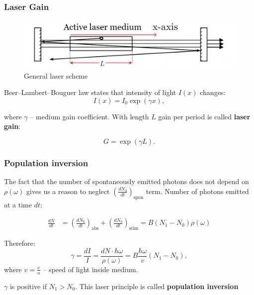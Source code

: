 \documentclass{beamer}
\begin{document}
	\begin{frame}
	\frametitle{Laser Gain}
	
	\begin{figure}
		\centering
		\includegraphics[width=1\linewidth]{res/general_laser_scheme.pdf}
		\caption{General laser scheme}
		\label{fig:general_laser_scheme}
	\end{figure}
	Beer–Lambert–Bouguer law states that intensity of light $I(x)$ changes:
	$$I(x) = I_0 \exp({\gamma x}),$$
	
	where $\gamma$ -- medium gain coefficient. With length $L$ gain per period is called \textbf{laser gain}:
	
	$$G = \exp{(\gamma L)}.$$
	\end{frame}
	
	\begin{frame}
		\frametitle{Population inversion}
		The fact that the number of spontaneously emitted photons does not depend on  $\rho(\omega)$ gives us a reason to neglect $\left(\frac{dN_0}{dt}\right)_{\text{spon}}$ term. Number of photons emitted at a time $dt$:
		
		\begin{equation} \label{eq1}
			\begin{split}
				\frac{dN}{dt} & = \left(\frac{dN_0}{dt}\right)_{\text{abs}} + \left(\frac{dN_0}{dt}\right)_{\text{stim}} =  B (N_1 - N_0) \rho(\omega)
			\end{split}
		\end{equation}

		Therefore:
		\begin{equation}
			\gamma = \frac{dI}{I} = \frac{dN \cdot \hbar\omega}{\rho(\omega)} = B\frac{\hbar\omega }{v} (N_1 - N_0), 
		\end{equation}
		where $v = \frac{c}{n}$ -- speed of light inside medium.
		
		\vspace*{20px}
		\centering
		$\gamma$ is positive if $N_1 > N_0$. This laser principle is called \textbf{population inversion}
	\end{frame}
\end{document}

